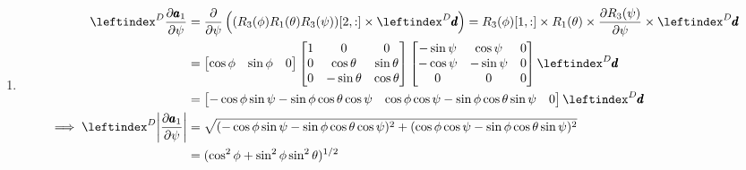 \begin{enumerate}
\item
\begin{align*}
    \lx{^D}{\frac {\partial \pmb a_1}  {\partial \psi}} &=  \frac{\partial}{\partial \psi} \left((R_3(\phi)R_1(\theta) R_3(\psi))[2,:] \times \lx{^D}{\pmb d} \right)
    = R_3(\phi)[1,:] \times R_1(\theta) \times \frac{\partial R_3(\psi)}{\partial \psi} \times \lx{^D}{\pmb d}\\
    &= \bm{\cos \phi & \sin \phi  & 0}
      \bm{
            1 & 0 & 0\\
            0 & \cos \theta & \sin \theta\\
            0 & -\sin \theta & \cos \theta
        }
      \bm{
            -\sin \psi & \cos \psi  & 0\\
            -\cos \psi & -\sin \psi & 0\\
            0          & 0         & 0
        }\lx{^D}{\pmb d}\\
    &= \bm{-\cos \phi \sin \psi - \sin \phi \cos \theta \cos \psi &
          \cos \phi \cos \psi - \sin \phi \cos \theta \sin \psi &
          0} \lx{^D}{\pmb d}\\
     \implies \lx{^D}{\norm{\frac {\partial \pmb a_1}  {\partial \psi}}} &=
    \sqrt{(-\cos \phi \sin \psi - \sin \phi \cos \theta \cos \psi )^2 +
    (\cos \phi \cos \psi - \sin \phi \cos \theta \sin \psi )^2}\\
    &= (\cos^2 \phi + \sin^2\phi \sin^2 \theta)^{1/2}
\end{align*}

\end{enumerate}
